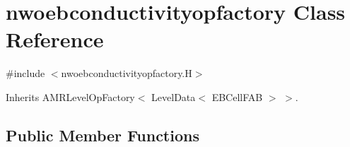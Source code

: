 \hypertarget{classnwoebconductivityopfactory}{}\section{nwoebconductivityopfactory Class Reference}
\label{classnwoebconductivityopfactory}


{\ttfamily \#include $<$nwoebconductivityopfactory.\+H$>$}



Inherits A\+M\+R\+Level\+Op\+Factory$<$ Level\+Data$<$ E\+B\+Cell\+F\+A\+B $>$ $>$.

\subsection*{Public Member Functions}
